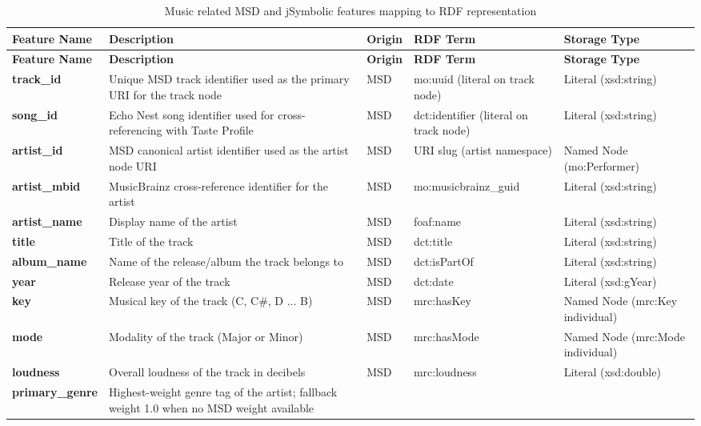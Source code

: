 \begin{longtable}{
>{\ttfamily\bfseries\RaggedRight\arraybackslash}p{}
>{\RaggedRight\arraybackslash}p{}
>{\RaggedRight\arraybackslash}p{}
>{\ttfamily\RaggedRight\arraybackslash}p{}
>{\RaggedRight\arraybackslash}p{}
}
\caption{Music related MSD and jSymbolic features mapping to RDF representation}
\label{tab:kg_features}\\
\toprule
\textbf{Feature Name} &
\textbf{Description} &
\textbf{Origin} &
\textbf{RDF Term} &
\textbf{Storage Type} \\
\midrule
\endfirsthead
\toprule
\textbf{Feature Name} &
\textbf{Description} &
\textbf{Origin} &
\textbf{RDF Term} &
\textbf{Storage Type} \\
\midrule
\endhead
\bottomrule
\endfoot
track\_id &
Unique MSD track identifier used as the primary URI for the track node &
MSD &
mo:uuid (literal on track node) &
Literal (xsd:string)
\\
song\_id &
Echo Nest song identifier used for cross-referencing with Taste Profile &
MSD &
dct:identifier (literal on track node) &
Literal (xsd:string)
\\
artist\_id &
MSD canonical artist identifier used as the artist node URI &
MSD &
URI slug (artist namespace) &
Named Node (mo:Performer)
\\
artist\_mbid &
MusicBrainz cross-reference identifier for the artist &
MSD &
mo:musicbrainz\_guid &
Literal (xsd:string)
\\
artist\_name &
Display name of the artist &
MSD &
foaf:name &
Literal (xsd:string)
\\
title &
Title of the track &
MSD &
dct:title &
Literal (xsd:string)
\\
album\_name &
Name of the release/album the track belongs to &
MSD &
dct:isPartOf &
Literal (xsd:string)
\\
year &
Release year of the track &
MSD &
dct:date &
Literal (xsd:gYear)
\\
key &
Musical key of the track (C, C\#, D ... B) &
MSD &
mrc:hasKey &
Named Node (mrc:Key individual)
\\
mode &
Modality of the track (Major or Minor) &
MSD &
mrc:hasMode &
Named Node (mrc:Mode individual)
\\
loudness &
Overall loudness of the track in decibels &
MSD &
mrc:loudness &
Literal (xsd:double)
\\
primary\_genre &
Highest-weight genre tag of the artist; fallback weight 1.0 when no MSD weight available &

\end{longtable}
